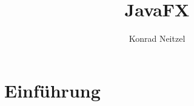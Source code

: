 \documentclass[10pt,a4paper]{book}
\title{JavaFX}
\author{Konrad Neitzel}
\begin{document}
\parindent 0pt
\maketitle
\chapter{Einführung}



{}

\end{document}
